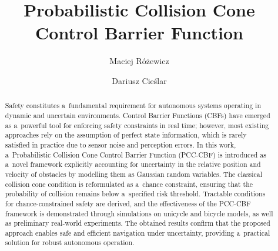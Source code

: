 \documentclass{svproc}
\begin{document}
\mainmatter              %
%
\title{Probabilistic Collision Cone Control Barrier Function}
%
%
\author{Maciej Różewicz \and Dariusz Cieślar}
%
%
%

\maketitle              %

\begin{abstract}
Safety constitutes a~fundamental requirement for autonomous systems operating in
dynamic and uncertain environments. Control Barrier Functions (CBFs) have
emerged as a~powerful tool for enforcing safety constraints in real time;
however, most existing approaches rely on the assumption of perfect state
information, which is rarely satisfied in practice due to sensor noise and
perception errors.
In this work, a~Probabilistic Collision Cone Control Barrier Function (PCC-CBF)
is introduced as a~novel framework explicitly accounting for uncertainty in the
relative position and velocity of obstacles by modelling them as Gaussian random
variables. The classical collision cone condition is reformulated as a~chance
constraint, ensuring that the probability of collision remains below a~specified
risk threshold.
Tractable conditions for chance-constrained safety are derived, and the
effectiveness of the PCC-CBF framework is demonstrated through simulations on
unicycle and bicycle models, as well as preliminary real-world experiments. The
obtained results confirm that the proposed approach enables safe and efficient
navigation under uncertainty, providing a~practical solution for robust
autonomous operation.
\end{abstract}
\end{document}
